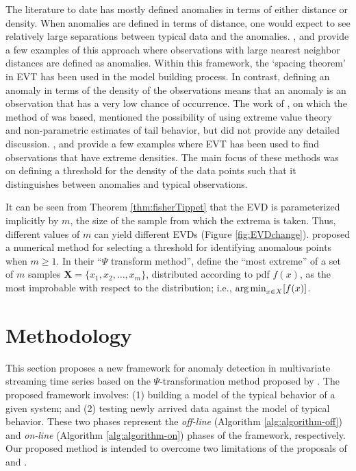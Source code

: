 \documentclass[12pt]{article}
\begin{document}
\label{sec:previousworkEVT}

The literature to date has mostly defined anomalies in terms of either
distance or density. When anomalies are defined in terms of distance,
one would expect to see relatively large separations between typical
data and the anomalies. \citet{burridge2006additive},
\citet{schwarz2008wind} and \citet{wilkinsonvisualizing} provide a few
examples of this approach where observations with large nearest neighbor
distances are defined as anomalies. Within this framework, the `spacing
theorem' \citep{schwarz2008wind} in EVT has been used in the model
building process. In contrast, defining an anomaly in terms of the
density of the observations means that an anomaly is an observation that
has a very low chance of occurrence. The work of
\citet{perron2003searching}, on which the method of
\citet{burridge2006additive} was based, mentioned the possibility of
using extreme value theory and non-parametric estimates of tail
behavior, but did not provide any detailed discussion.
\citet{sundaram2009aircraft}, \citet{clifton2011novelty} and
\citet{hugueny2013novelty} provide a few examples where EVT has been
used to find observations that have extreme densities. The main focus of
these methods was on defining a threshold for the density of the data
points such that it distinguishes between anomalies and typical
observations.

It can be seen from Theorem \ref{thm:fisherTippet} that the EVD is
parameterized implicitly by \(m\), the size of the sample from which the
extrema is taken. Thus, different values of \(m\) can yield different
EVDs (Figure \ref{fig:EVDchange}). \citet{clifton2011novelty} proposed a
numerical method for selecting a threshold for identifying anomalous
points when \(m\ge 1\). In their ``\(\Psi\) transform method'',
\citet{clifton2011novelty} define the ``most extreme'' of a set of \(m\)
samples \(\bm{X}=\{x_{1}, x_{2},\dots, x_{m}\}\), distributed according
to pdf \(f(x)\), as the most improbable with respect to the
distribution; i.e., \(\text{arg\,min}_{x\in X}[f(x)]\).

\hypertarget{methodology}{%
\section{Methodology}\label{methodology}}

\label{sec:methodology}

This section proposes a new framework for anomaly detection in
multivariate streaming time series based on the \(\Psi\)-transformation
method proposed by \citet{clifton2011novelty}. The proposed framework
involves: (1) building a model of the typical behavior of a given
system; and (2) testing newly arrived data against the model of typical
behavior. These two phases represent the \emph{off-line} (Algorithm
\ref{alg:algorithm-off}) and \emph{on-line} (Algorithm
\ref{alg:algorithm-on}) phases \citep{faria2016novelty} of the
framework, respectively. Our proposed method is intended to overcome two
limitations of the proposals of \citet{hyndman2015large} and
\citet{wilkinsonvisualizing}.
\end{document}
